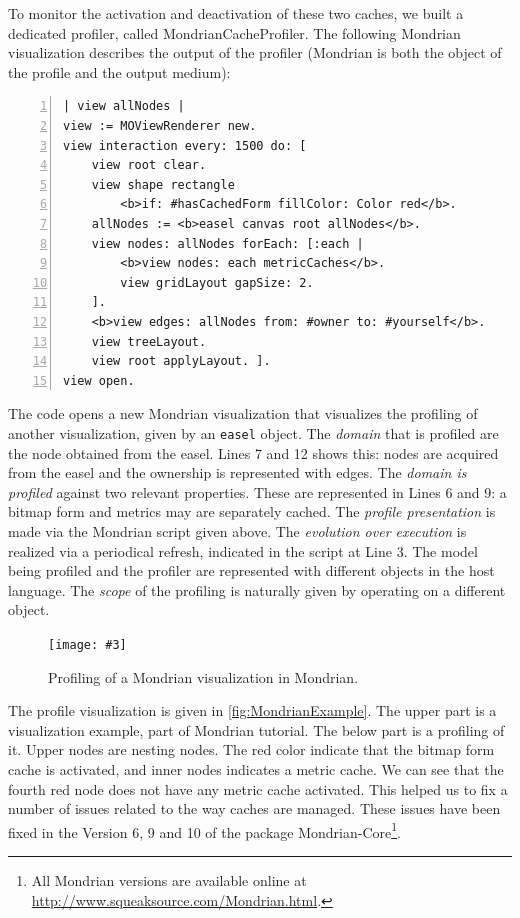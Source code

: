 \documentclass[runningheads]{llncs}
\newcommand{\ct}{\lstinline[backgroundcolor=\color{white},basicstyle=\footnotesize\ttfamily]}
\newcommand{\ab}[1]{\nb{Alexandre}{blue}{#1}}
\newcommand{\jr}[1]{\nb{Jorge}{cyan}{#1}}
\newcommand{\fig}[4]{
	\begin{figure}[#1]
		\centering
		\texttt{[image: \#3]}
		\caption{\label{fig:#3}#4}
	\end{figure}}
\begin{document}
To monitor the activation and deactivation of these two caches, we built a dedicated profiler, called {\sc MondrianCacheProfiler}. The following Mondrian visualization describes the output of the profiler (Mondrian is both the object of the profile and the output medium):

\begin{lstlisting}[numbers=left]
| view allNodes |
view := MOViewRenderer new.
view interaction every: 1500 do: [
	view root clear.
	view shape rectangle
		<b>if: #hasCachedForm fillColor: Color red</b>.
	allNodes := <b>easel canvas root allNodes</b>.
	view nodes: allNodes forEach: [:each |
		<b>view nodes: each metricCaches</b>.
		view gridLayout gapSize: 2.
	].  
	<b>view edges: allNodes from: #owner to: #yourself</b>.
	view treeLayout.
	view root applyLayout. ].	
view open.
\end{lstlisting}

The code opens a new Mondrian visualization that visualizes the profiling of another visualization, given by an \ct{easel} object. The \emph{domain} that is profiled are the node obtained from the easel. Lines 7 and 12 shows this: nodes are acquired from the easel and the ownership is represented with edges. The \emph{domain is profiled} against two relevant properties. These are represented in Lines 6 and 9: a bitmap form and metrics may are separately cached. The \emph{profile presentation} is made via the Mondrian script given above. The \emph{evolution over execution} is realized via a periodical refresh, indicated in the script at Line 3. The model being profiled and the profiler are represented with different objects in the host language. The \emph{scope} of the profiling is naturally given by operating on a different object.

\fig{}{.8}{MondrianExample}{Profiling of a Mondrian visualization in Mondrian.}

The profile visualization is given in \autoref{fig:MondrianExample}. The upper part is a visualization example, part of Mondrian tutorial. The below part is a profiling of it. Upper nodes are nesting nodes. The red color indicate that the bitmap form cache is activated, and inner nodes indicates a metric cache. We can see that the fourth red node does not have any metric cache activated. This helped us to fix a number of issues related to the way caches are managed. These issues have been fixed in the Version 6, 9 and 10 of the package Mondrian-Core\footnote{All Mondrian versions are available online at \url{http://www.squeaksource.com/Mondrian.html}.}.
\end{document}
